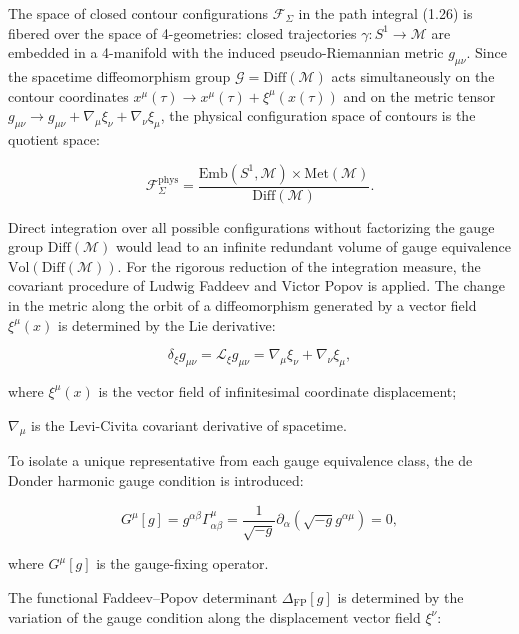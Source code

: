 The space of closed contour configurations $\mathcal{F}_\Sigma$ in the path integral (1.26) is fibered over the space of 4-geometries: closed trajectories $\gamma: S^1 \to \mathcal{M}$ are embedded in a 4-manifold with the induced pseudo-Riemannian metric $g_{\mu\nu}$. Since the spacetime diffeomorphism group $\mathcal{G} = \text{Diff}(\mathcal{M})$ acts simultaneously on the contour coordinates $x^\mu(\tau) \to x^\mu(\tau) + \xi^\mu(x(\tau))$ and on the metric tensor $g_{\mu\nu} \to g_{\mu\nu} + \nabla_\mu \xi_\nu + \nabla_\nu \xi_\mu$, the physical configuration space of contours is the quotient space:

\begin{equation}\label{eq:1.42}\tag{1.42}
\mathcal{F}_\Sigma^{\text{phys}} = \frac{\text{Emb}(S^1, \mathcal{M}) \times \text{Met}(\mathcal{M})}{\text{Diff}(\mathcal{M})}.
\end{equation}

Direct integration over all possible configurations without factorizing the gauge group $\text{Diff}(\mathcal{M})$ would lead to an infinite redundant volume of gauge equivalence $\text{Vol}(\text{Diff}(\mathcal{M}))$. For the rigorous reduction of the integration measure, the covariant procedure of Ludwig Faddeev and Victor Popov \cite{ref7} is applied. The change in the metric along the orbit of a diffeomorphism generated by a vector field $\xi^\mu(x)$ is determined by the Lie derivative:

\begin{equation}\label{eq:1.43}\tag{1.43}
\delta_\xi g_{\mu\nu} = \mathcal{L}_\xi g_{\mu\nu} = \nabla_\mu \xi_\nu + \nabla_\nu \xi_\mu,
\end{equation}

where $\xi^\mu(x)$ is the vector field of infinitesimal coordinate displacement;  

$\nabla_\mu$ is the Levi-Civita covariant derivative of spacetime.

To isolate a unique representative from each gauge equivalence class, the de Donder harmonic gauge condition is introduced:

\begin{equation}\label{eq:1.44}\tag{1.44}
G^\mu[g] = g^{\alpha\beta} \Gamma^\mu_{\alpha\beta} = \frac{1}{\sqrt{-g}} \partial_\alpha \left( \sqrt{-g} g^{\alpha\mu} \right) = 0,
\end{equation}

where $G^\mu[g]$ is the gauge-fixing operator.

The functional Faddeev--Popov determinant $\Delta_{\text{FP}}[g]$ is determined by the variation of the gauge condition along the displacement vector field $\xi^\nu$:

